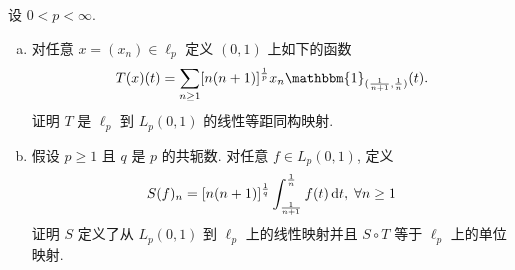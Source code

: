 \begin{exercise}
    设 $0<p<\infty$.
    \begin{enumerate}[(a)]
        \item 对任意 $x=(x_n)\in\ell_p$ 定义 $(0,1)$ 上如下的函数
        \[T(x)(t)=\sum_{n\geq 1}[n(n+1)]^{\frac{1}{p}}x_n\mathbbm{1}_{(\frac{1}{n+1},\frac{1}{n})}(t).\]
        证明 $T$ 是 $\ell_p$ 到 $L_p(0,1)$ 的线性等距同构映射.
        \item 假设 $p\geq 1$ 且 $q$ 是 $p$ 的共轭数. 对任意 $f\in L_p(0,1)$, 定义
        \[S(f)_n=[n(n+1)]^{\frac{1}{q}}\int_{\frac{1}{n+1}}^{\frac{1}{n}}f(t)\mathop{}\!\mathrm{d} t,\;\forall n\geq 1\]
        证明 $S$ 定义了从 $L_p(0,1)$ 到 $\ell_p$ 上的线性映射并且 $S\circ T$ 等于 $\ell_p$ 上的单位映射.
    \end{enumerate}
\end{exercise}

